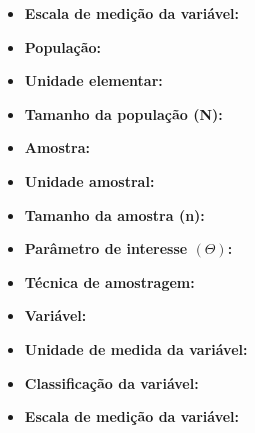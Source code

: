 \begin{enumerate}
\begin{itemize}
		\item \textbf{Escala de medição da variável:}~
	\end{itemize}

	\subitem 

	\begin{itemize}	
		\item \textbf{População:}~
		
		\item \textbf{Unidade elementar:}~
		
		\item \textbf{Tamanho da população (N):}~
		
		\item \textbf{Amostra:}~
		
		\item \textbf{Unidade amostral:}~
		
		\item \textbf{Tamanho da amostra (n):}~
		
		\item \textbf{Parâmetro de interesse $\left(\varTheta\right)$:}~
		
		\item \textbf{Técnica de amostragem:}~
		
		\item \textbf{Variável:}~
		
		\item \textbf{Unidade de medida da variável:}~
		
		\item \textbf{Classificação da variável:}~
		
		\item \textbf{Escala de medição da variável:}~
	\end{itemize}
	
\end{enumerate}



